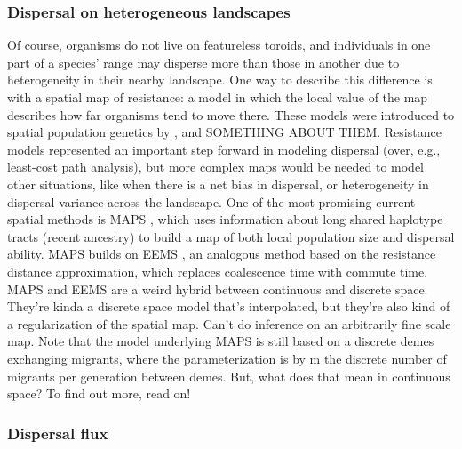 \documentclass{ar-1col}
\newcommand{\todo}[1]{{\textbf{\color{red}{#1}}}}
\begin{document}
\subsubsection{Dispersal on heterogeneous landscapes}
\todo{needs polish!, also, incorporate Erik's paper?}
Of course, organisms do not live on featureless toroids, 
and individuals in one part of a species' range may disperse more than those in another 
due to heterogeneity in their nearby landscape.
One way to describe this difference is with a spatial map of resistance: 
a model in which the local value of the map describes how far organisms tend to move there.
These models were introduced to spatial population genetics by \citet{McRae2006,McRae_Beier_2007,McRae2008}, 
and SOMETHING ABOUT THEM.
Resistance models represented an important step forward in modeling dispersal 
(over, e.g., least-cost path analysis), 
but more complex maps would be needed to model other situations, 
like when there is a net bias in dispersal, 
or heterogeneity in dispersal variance across the landscape.
One of the most promising current spatial methods is MAPS \citep{alasadi2018estimating}, 
which uses information about long shared haplotype tracts (recent ancestry) 
to build a map of both local population size and dispersal ability.  
MAPS builds on EEMS \citep{petkova2016visualizing}, an analogous method 
based on the resistance distance approximation, 
which replaces coalescence time with commute time.
MAPS and EEMS are a weird hybrid between continuous and discrete space.  
They’re kinda a discrete space model that’s interpolated, 
but they’re also kind of a regularization of the spatial map.  
Can’t do inference on an arbitrarily fine scale map.  
Note that the model underlying MAPS is still based on a discrete demes exchanging migrants, 
where the parameterization is by m the discrete number of migrants per generation between demes.  
But, what does that mean in continuous space?
To find out more, read on!


\subsubsection{Dispersal flux}
\end{document}
